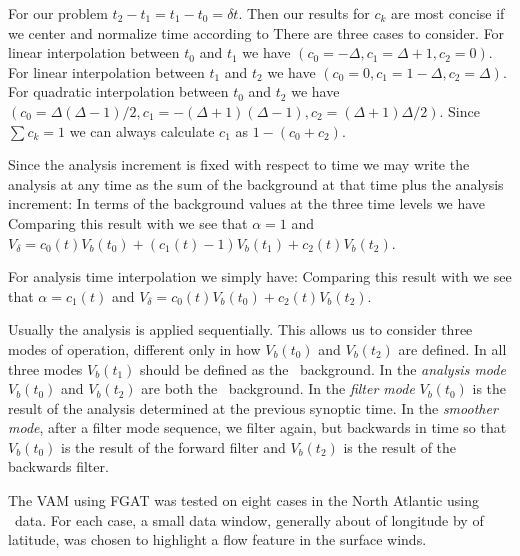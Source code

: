 \documentclass[12pt,titlepage]{article}
\begin{document}
For our problem $t_2 - t_1 = t_1 - t_0 = \delta t$.
Then our results for $c_k$ are most concise if we center and normalize
time according to 
There are three cases to consider.
For linear interpolation between $t_0$ and $t_1$ we have $(c_0 =
-\Delta, c_1 = \Delta + 1, c_2 = 0)$.
For linear interpolation between $t_1$ and $t_2$ we have $(c_0 = 0, c_1
= 1 - \Delta, c_2 = \Delta)$.
For quadratic interpolation between $t_0$ and $t_2$ we have $(c_0 =
\Delta(\Delta - 1)/2, c_1 = -(\Delta + 1)(\Delta - 1), c_2 = (\Delta +
1)\Delta/2)$.
Since $\sum c_k = 1$ we can always calculate $c_1$ as $1-(c_0 + c_2)$.


Since the analysis increment is fixed with respect to time we may
write the analysis at any time as the sum of the background at that
time plus the analysis increment:
 \eql{fgat1}{V_a(t) = V_b(t) + [V_a(t_1) - V_b(t_1) .}
In terms of the background values at the three time levels we have
Comparing this result with  we see that $\alpha = 1$ and
$V_{\delta} = c_0(t) V_b(t_0) + (c_1(t) - 1) V_b(t_1) + c_2(t)
V_b(t_2)$.


For analysis time interpolation we simply have:
Comparing this result with  we see that $\alpha = c_1(t)$
and $V_{\delta} = c_0(t) V_b(t_0) + c_2(t) V_b(t_2)$.


Usually the analysis is applied sequentially.
This allows us to consider three modes of operation, different only
in how $V_b(t_0)$ and $V_b(t_2)$ are defined.
In all three modes $V_b(t_1)$ should be defined as the \apriori\
background.
In the \emph{analysis mode} $V_b(t_0)$ and $V_b(t_2)$ are both the
\apriori\ background.
In the \emph{filter mode} $V_b(t_0)$ is the result of the analysis
determined at the previous synoptic time.
In the \emph{smoother mode}, after a filter mode sequence, we filter
again, but backwards in time so that $V_b(t_0)$ is the result of the
forward filter and $V_b(t_2)$ is the result of the backwards filter.


The VAM using FGAT was tested on eight cases in the North Atlantic using
\qscat\ data.  For each case, a small data window, generally about
\degrees{12} of longitude by \degrees{8} of latitude, was chosen to
highlight a flow feature in the surface winds.
\end{document}
